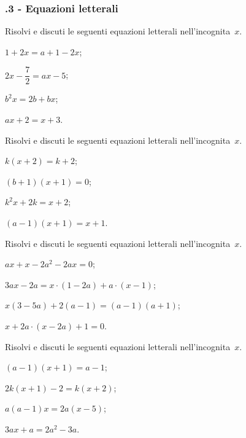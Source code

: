 \subsubsection*{\thechapter.3 - Equazioni letterali}

\begin{esercizio}[\Ast]
\label{ese:20.34}
Risolvi e discuti le seguenti equazioni letterali nell'incognita~$x$.
\begin{multicols}{2}
\begin{enumeratea}
 \item $1+2x=a+1-2x$;
 \item $2x-\dfrac{7}{2}=ax-5$;
 \item $b^{2}x=2b+bx$;
 \item $ax+2=x+3$.
\end{enumeratea}
\end{multicols}
\end{esercizio}

\begin{esercizio}[\Ast]
\label{ese:20.35}
Risolvi e discuti le seguenti equazioni letterali nell'incognita~$x$.
\begin{multicols}{2}
\begin{enumeratea}
 \item $k(x+2)=k+2$;
 \item $(b+1)(x+1)=0$;
 \item $k^{2}x+2k=x+2$;
 \item $(a-1)(x+1)=x+1$.
\end{enumeratea}
\end{multicols}
\end{esercizio}

\begin{esercizio}
\label{ese:20.36}
Risolvi e discuti le seguenti equazioni letterali nell'incognita~$x$.
\begin{multicols}{2}
\begin{enumeratea}
 \item $ax+x-2a^{2}-2ax=0$;
 \item $3ax-2a=x\cdot (1-2a)+a\cdot (x-1)$;
 \item $x (3-5a)+2 (a-1)=(a-1) (a+1)$;
 \item $x+2a\cdot (x-2a)+1=0$.
\end{enumeratea}
\end{multicols}
\end{esercizio}
\begin{esercizio}[\Ast]
\label{ese:20.37}
Risolvi e discuti le seguenti equazioni letterali nell'incognita~$x$.
\begin{multicols}{2}
\begin{enumeratea}
 \item $(a-1)(x+1)=a-1$;
 \item $2k(x+1)-2=k(x+2)$;
 \item $a(a-1)x=2a(x-5)$;
 \item $3ax+a=2a^{2}-3a$.
\end{enumeratea}
\end{multicols}
\end{esercizio}

